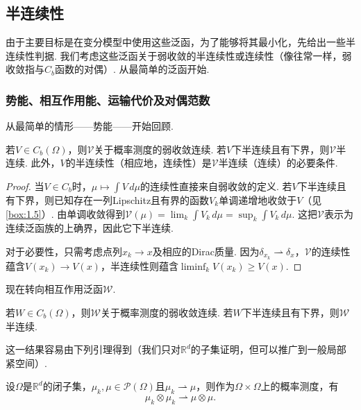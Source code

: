 \subsection{半连续性}\label{sec:7.1}
由于主要目标是在变分模型中使用这些泛函，为了能够将其最小化，先给出一些半连续性判据. 我们考虑这些泛函关于弱收敛的半连续性或连续性（像往常一样，弱收敛指与$C_b$函数的对偶）. 从最简单的泛函开始.

\subsubsection{势能、相互作用能、运输代价及对偶范数}\label{sec:7.1.1}
从最简单的情形——势能——开始回顾.
\begin{proposition}\label{obj:7.1}
若$V\in C_b(\Omega)$，则$\mathscr V$关于概率测度的弱收敛连续. 若$V$下半连续且有下界，则$\mathscr V$半连续. 此外，$V$的半连续性（相应地，连续性）是$\mathscr V$半连续（连续）的必要条件.
\end{proposition}
\begin{proof}
当$V\in C_b$时，$\mu\mapsto\int V\,d\mu$的连续性直接来自弱收敛的定义. 若$V$下半连续且有下界，则已知存在一列Lipschitz且有界的函数$V_k$单调递增地收敛于$V$（见\autoref{box:1.5}）. 由单调收敛得到$\mathscr V(\mu)=\lim_k\int V_k\,d\mu=\sup_k\int V_k\,d\mu$. 这把$\mathscr V$表示为连续泛函族的上确界，因此它下半连续.

对于必要性，只需考虑点列$x_k\to x$及相应的Dirac质量. 因为$\delta_{x_k}\rightharpoonup\delta_x$，$\mathscr V$的连续性蕴含$V(x_k)\to V(x)$，半连续性则蕴含$\liminf_kV(x_k)\geq V(x)$.
\end{proof}
现在转向相互作用泛函$\mathscr W$.
\begin{proposition}\label{obj:7.2}
若$W\in C_b(\Omega)$，则$\mathscr W$关于概率测度的弱收敛连续. 若$W$下半连续且有下界，则$\mathscr W$半连续.
\end{proposition}
这一结果容易由下列引理得到（我们只对$\mathbb R^d$的子集证明，但可以推广到一般局部紧空间）.
\begin{lemma}\label{obj:7.3}
设$\Omega$是$\mathbb R^d$的闭子集，$\mu_k,\mu\in\mathscr P(\Omega)$且$\mu_k\rightharpoonup\mu$，则作为$\Omega\times\Omega$上的概率测度，有
\[
 \mu_k\otimes\mu_k\rightharpoonup\mu\otimes\mu.
\]
\end{lemma}
